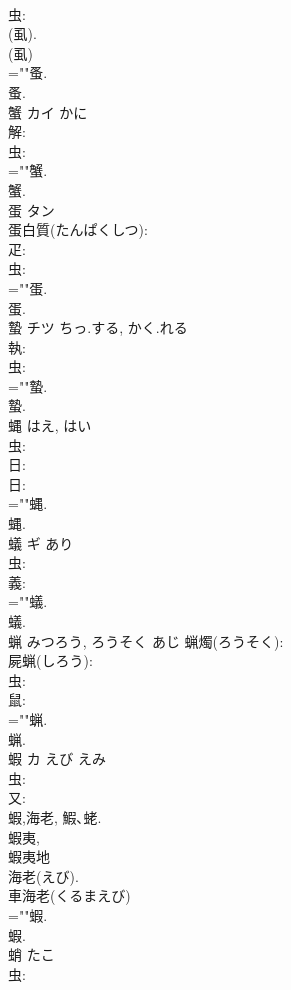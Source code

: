 \documentclass[8pt]{extreport}
\begin{document}
\begin{CJK}{UTF8}{min}
\\	虫: 
\\	(虱). 
\\	(虱) 
\\	=""蚤.
\\	蚤.
\\	蟹	カイ	かに		
\\	解: 
\\	虫: 
\\	=""蟹.
\\	蟹.
\\	蛋	タン			
\\	蛋白質(たんぱくしつ): 
\\	疋: 
\\	虫: 
\\	=""蛋.
\\	蛋.
\\	蟄	チツ	ちっ.する, かく.れる		
\\	執: 
\\	虫: 
\\	=""蟄.
\\	蟄.
\\	蝿		はえ, はい				
\\	虫: 
\\	日: 
\\	日: 
\\	=""蝿.
\\	蝿.
\\	蟻	ギ	あり		
\\	虫: 
\\	義: 
\\	=""蟻.
\\	蟻.
\\	蝋		みつろう, ろうそく	あじ		蝋燭(ろうそく): 
\\	屍蝋(しろう): 
\\	虫: 
\\	鼠: 
\\	=""蝋.
\\	蝋.
\\	蝦	カ	えび	えみ	
\\	虫: 
\\	又: 
\\	蝦,海老, 鰕､蛯. 
\\	蝦夷, 
\\	蝦夷地 
\\	海老(えび). 
\\	車海老(くるまえび) 
\\	=""蝦.
\\	蝦.
\\	蛸		たこ				
\\	虫: 

\end{CJK}
\end{document}
